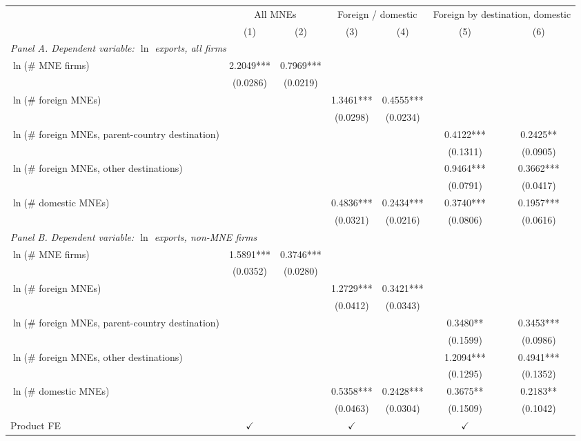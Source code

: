 \begin{tabular}{lcccccc} \hline
 & \multicolumn{2}{c}{All MNEs} & \multicolumn{2}{c}{Foreign / domestic} & \multicolumn{2}{c}{Foreign by destination, domestic} \\
 & (1) & (2) & (3) & (4) & (5) & (6) \\ \hline
\multicolumn{7}{l}{\textit{Panel A. Dependent variable: $\ln$ exports, all firms}} \\
$\ln$(\# MNE firms) & 2.2049*** & 0.7969*** &  &  &  &  \\
 & (0.0286) & (0.0219) &  &  &  &  \\
$\ln$(\# foreign MNEs) &  &  & 1.3461*** & 0.4555*** &  &  \\
 &  &  & (0.0298) & (0.0234) &  &  \\
$\ln$(\# foreign MNEs, parent-country destination) &  &  &  &  & 0.4122*** & 0.2425** \\
 &  &  &  &  & (0.1311) & (0.0905) \\
$\ln$(\# foreign MNEs, other destinations) &  &  &  &  & 0.9464*** & 0.3662*** \\
 &  &  &  &  & (0.0791) & (0.0417) \\
$\ln$(\# domestic MNEs) &  &  & 0.4836*** & 0.2434*** & 0.3740*** & 0.1957*** \\
 &  &  & (0.0321) & (0.0216) & (0.0806) & (0.0616) \\
\midrule
\multicolumn{7}{l}{\textit{Panel B. Dependent variable: $\ln$ exports, non-MNE firms}} \\
$\ln$(\# MNE firms) & 1.5891*** & 0.3746*** &  &  &  &  \\
 & (0.0352) & (0.0280) &  &  &  &  \\
$\ln$(\# foreign MNEs) &  &  & 1.2729*** & 0.3421*** &  &  \\
 &  &  & (0.0412) & (0.0343) &  &  \\
$\ln$(\# foreign MNEs, parent-country destination) &  &  &  &  & 0.3480** & 0.3453*** \\
 &  &  &  &  & (0.1599) & (0.0986) \\
$\ln$(\# foreign MNEs, other destinations) &  &  &  &  & 1.2094*** & 0.4941*** \\
 &  &  &  &  & (0.1295) & (0.1352) \\
$\ln$(\# domestic MNEs) &  &  & 0.5358*** & 0.2428*** & 0.3675** & 0.2183** \\
 &  &  & (0.0463) & (0.0304) & (0.1509) & (0.1042) \\
\hline
Product FE & $\checkmark$ &  & $\checkmark$ &  & $\checkmark$ &  \\

\end{tabular}
